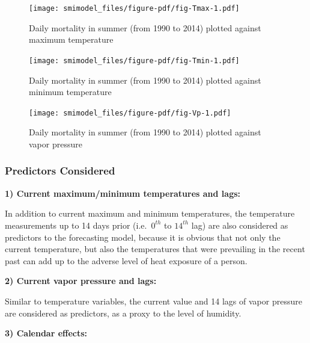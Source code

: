 \documentclass[11pt,a4paper,]{article}
\begin{document}
\begin{figure}

{\centering \texttt{[image: smimodel\_files/figure-pdf/fig-Tmax-1.pdf]}

}

\caption{\label{fig-Tmax}Daily mortality in summer (from 1990 to 2014)
plotted against maximum temperature}

\end{figure}

\begin{figure}

{\centering \texttt{[image: smimodel\_files/figure-pdf/fig-Tmin-1.pdf]}

}

\caption{\label{fig-Tmin}Daily mortality in summer (from 1990 to 2014)
plotted against minimum temperature}

\end{figure}

\begin{figure}

{\centering \texttt{[image: smimodel\_files/figure-pdf/fig-Vp-1.pdf]}

}

\caption{\label{fig-Vp}Daily mortality in summer (from 1990 to 2014)
plotted against vapor pressure}

\end{figure}

\hypertarget{predictors-considered}{%
\subsubsection{Predictors Considered}\label{predictors-considered}}

\textbf{1) Current maximum/minimum temperatures and lags:}

In addition to current maximum and minimum temperatures, the temperature
measurements up to 14 days prior (i.e.~\(0^{th}\) to \(14^{th}\) lag)
are also considered as predictors to the forecasting model, because it
is obvious that not only the current temperature, but also the
temperatures that were prevailing in the recent past can add up to the
adverse level of heat exposure of a person.

\textbf{2) Current vapor pressure and lags:}

Similar to temperature variables, the current value and 14 lags of vapor
pressure are considered as predictors, as a proxy to the level of
humidity.

\textbf{3) Calendar effects:}
\end{document}
